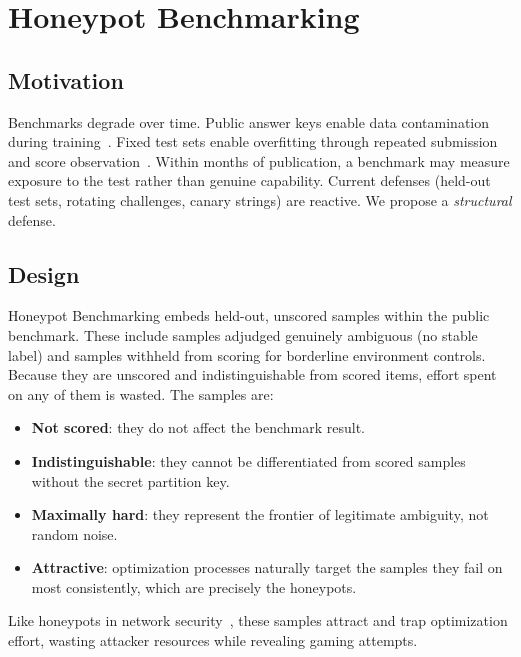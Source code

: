 \documentclass[conference]{IEEEtran}
\begin{document}
\section{Honeypot Benchmarking}
\label{sec:honeypot}

\subsection{Motivation}

Benchmarks degrade over time. Public answer keys enable data contamination during training~\cite{jacovi2023}. Fixed test sets enable overfitting through repeated submission and score observation~\cite{oren2024}. Within months of publication, a benchmark may measure exposure to the test rather than genuine capability. Current defenses (held-out test sets, rotating challenges, canary strings) are reactive. We propose a \emph{structural} defense.

\subsection{Design}

Honeypot Benchmarking embeds held-out, unscored samples within the public benchmark. These include samples adjudged genuinely ambiguous (no stable label) and samples withheld from scoring for borderline environment controls. Because they are unscored and indistinguishable from scored items, effort spent on any of them is wasted. The samples are:

\begin{itemize}
    \item \textbf{Not scored}: they do not affect the benchmark result.
    \item \textbf{Indistinguishable}: they cannot be differentiated from scored samples without the secret partition key.
    \item \textbf{Maximally hard}: they represent the frontier of legitimate ambiguity, not random noise.
    \item \textbf{Attractive}: optimization processes naturally target the samples they fail on most consistently, which are precisely the honeypots.
\end{itemize}

Like honeypots in network security~\cite{spitzner2003}, these samples attract and trap optimization effort, wasting attacker resources while revealing gaming attempts.
\end{document}
